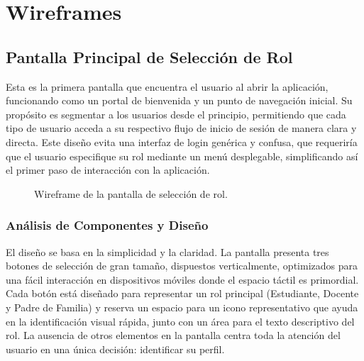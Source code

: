 \section{Wireframes}

\subsection{ Pantalla Principal de Selección de Rol}
\begin{samepage}\small
Esta es la primera pantalla que encuentra el usuario al abrir la aplicación, funcionando como un portal de bienvenida y un punto de navegación inicial. Su propósito es segmentar a los usuarios desde el principio, permitiendo que cada tipo de usuario acceda a su respectivo flujo de inicio de sesión de manera clara y directa. Este diseño evita una interfaz de login genérica y confusa, que requeriría que el usuario especifique su rol mediante un menú desplegable, simplificando así el primer paso de interacción con la aplicación.
\begin{figure}[H]
    \centering
    \caption{Wireframe de la pantalla de selección de rol.}\label{fig:wf-main}
\end{figure}
    \subsubsection*{Análisis de Componentes y Diseño}
    El diseño se basa en la simplicidad y la claridad. La pantalla presenta tres botones de selección de gran tamaño, dispuestos verticalmente, optimizados para una fácil interacción en dispositivos móviles donde el espacio táctil es primordial. Cada botón está diseñado para representar un rol principal (Estudiante, Docente y Padre de Familia) y reserva un espacio para un icono representativo que ayuda en la identificación visual rápida, junto con un área para el texto descriptivo del rol. La ausencia de otros elementos en la pantalla centra toda la atención del usuario en una única decisión: identificar su perfil.
    

\end{samepage}
